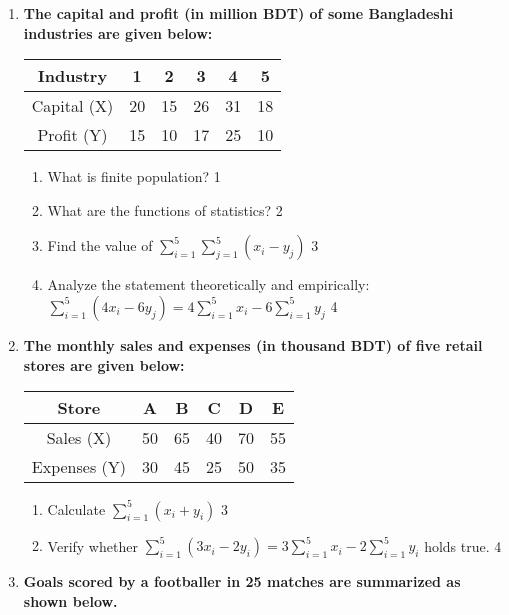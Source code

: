 \documentclass[a4paper,oneside]{book}
\begin{document}
\begin{enumerate}
   \item
	  \textbf{The capital and profit (in million BDT) of some Bangladeshi 
	  industries are given below:}
	  
	  \begin{table}[h]
	  \centering
\begin{tabular}{c|ccccc}
Industry & 1 & 2 & 3 & 4 & 5 \\ \hline
Capital (X) & 20 & 15 & 26 & 31 & 18 \\ \hline
Profit (Y) & 15 & 10 & 17 & 25 & 10
\end{tabular}
\end{table}
  
  \begin{enumerate}
    \item
	What is finite population? \hfill 1
    \item
	What are the functions of statistics? \hfill 2
    \item  
	Find the value of $\displaystyle \sum_{i=1}^5 \sum_{j=1}^5 (x_i - y_j)$ \hfill 3
    \item
	Analyze the statement theoretically and empirically:  $\displaystyle \sum_{i=1}^5 (4x_i-6y_j) = 4 \sum_{i=1}^5 x_i - 6 \sum_{i=1}^5 y_j $ \hfill 4
  \end{enumerate}
  
  \item
\textbf{The monthly sales and expenses (in thousand BDT) of five retail stores are given below:}

\begin{table}[h]
\centering
\begin{tabular}{c|ccccc}
Store & A & B & C & D & E \\ \hline
Sales (X) & 50 & 65 & 40 & 70 & 55 \\ \hline
Expenses (Y) & 30 & 45 & 25 & 50 & 35
\end{tabular}
\end{table}

\begin{enumerate}
    \item 
    Calculate $\displaystyle \sum_{i=1}^5 (x_i + y_i)$ \hfill 3
    \item 
    Verify whether $\displaystyle \sum_{i=1}^5 (3x_i - 2y_i) = 3 \sum_{i=1}^5 x_i - 2 \sum_{i=1}^5 y_i$ holds true. \hfill 4
\end{enumerate}


\item
	  \textbf{Goals scored by a footballer in 25 matches are summarized as shown below.} 
	  

\end{enumerate}
\end{document}
